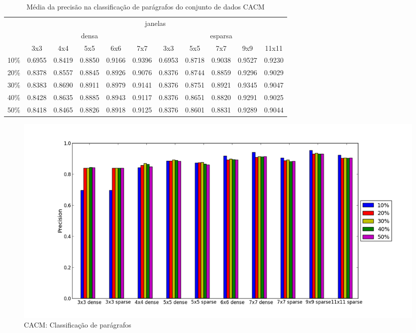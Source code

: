\documentclass[a4paper,11pt]{article}
\begin{document}
  \begin{center}
    \begin{table}[p]
      \caption{Média da precisão na classificação de parágrafos do conjunto de dados CACM}
      \begin{tabular}{ l | c c c c c || c c c c c | }
        \cline{2-11}
        & \multicolumn{10}{|c|}{janelas} \\
        \cline{2-11}
        & \multicolumn{5}{c||}{densa} & \multicolumn{5}{c|}{esparsa} \\
        \cline{2-11}
        & 3x3 & 4x4 & 5x5 & 6x6 & 7x7 & 3x3 & 5x5 & 7x7 & 9x9 & 11x11 \\
        \hline
        \multicolumn{1}{|l|}{10\%}& 0.6955& 0.8419& 0.8850& 0.9166& 0.9396& 0.6953& 0.8718& 0.9038& 0.9527& 0.9230\\
        \multicolumn{1}{|l|}{20\%}& 0.8378& 0.8557& 0.8845& 0.8926& 0.9076& 0.8376& 0.8744& 0.8859& 0.9296& 0.9029\\
        \multicolumn{1}{|l|}{30\%}& 0.8383& 0.8690& 0.8911& 0.8979& 0.9141& 0.8376& 0.8751& 0.8921& 0.9345& 0.9047\\
        \multicolumn{1}{|l|}{40\%}& 0.8428& 0.8635& 0.8885& 0.8943& 0.9117& 0.8376& 0.8651& 0.8820& 0.9291& 0.9025\\
        \multicolumn{1}{|l|}{50\%}& 0.8418& 0.8465& 0.8826& 0.8918& 0.9125& 0.8376& 0.8601& 0.8831& 0.9289& 0.9044\\
        \hline  
      \end{tabular}
      \label{tab:cacm_precision_paragraph}
    \end{table}
  \end{center}
    
  \begin{figure}[p]
    \centerline{\includegraphics[width=1.2\textwidth]{assets/experiment_charts/cacm_TextRegion_paragraph_precision.png}}
    \caption{CACM: Classificação de parágrafos}
    \label{fig:cacm_TextRegion_paragraph_precision}
  \end{figure}
\end{document}
